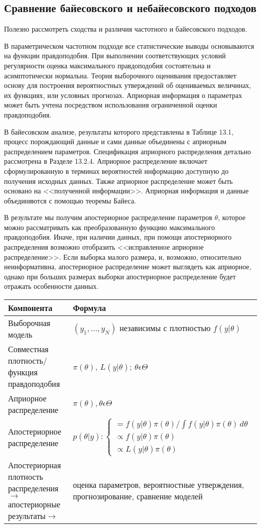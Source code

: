 \subsection{Сравнение байесовского и небайесовского подходов}

Полезно рассмотреть сходства и различия частотного и байесовского подходов.

В параметрическом частотном подходе все статистические выводы основываются на функции правдоподобия. При выполнении соответствующих условий регулярности оценка максимального правдоподобия состоятельна и асимптотически нормальна. Теория выборочного оценивания предоставляет основу для построения вероятностных утверждений об оцениваемых величинах, их  функциях, или условных прогнозах. Априорная информация о параметрах может быть учтена посредством использования ограниченной оценки правдоподобия.

В байесовском анализе, результаты которого представлены в Таблице 13.1, процесс порождающий данные и сами данные  объединены с априорным распределением параметров. Спецификация априорного распределения детально рассмотрена в Разделе 13.2.4. Априорное распределение включает сформулированную в терминах вероятностей информацию доступную до получения исходных данных. Также априорное  распределение может быть основано на <<полученной информации>>. Априорная информация и данные объединяются с помощью теоремы Байеса. 

В результате мы получим апостериорное распределение параметров $\theta$, которое можно рассматривать как преобразованную функцию максимального правдоподобия. Иначе, при наличии данных, при помощи апостериорного распределения возможно отобразить <<исправленное априорное распределение>>. Если выборка малого размера, и, возможно, относительно неинформативна, апостериорное распределение может выглядеть как априорное, однако при больших размерах выборки апостериорное распределение будет отражать особенности данных.


\begin{tabular}{p{6cm}p{8cm}}
Компонента & Формула \\ 
\hline
Выборочная модель & $(y_1,\ldots ,y_N)$ независимы с плотностью $f(y|\theta)$ \\  
Совместная плотность/ функция правдоподобия & $\pi(\theta)$, $L(y|\theta)$; $\theta{\epsilon}\Theta$ \\ 
Априорное распределение & $\pi(\theta), \theta{\epsilon}\Theta$ \\ 
Апостериорное распределение & $p(\theta|y):\begin{cases} 
=f(y|\theta)\pi(\theta)/\int f(y|\theta)\pi(\theta)\,d\theta \\
\propto f(y|\theta)\pi(\theta) \\
\propto L(y|\theta)\pi(\theta)
\end{cases}$ \\ 
Апостериорная плотность распределения$\rightarrow$ апостериорные результаты$\rightarrow$ & оценка параметров, вероятностные утверждения, прогнозирование, сравнение моделей
\end{tabular} 



